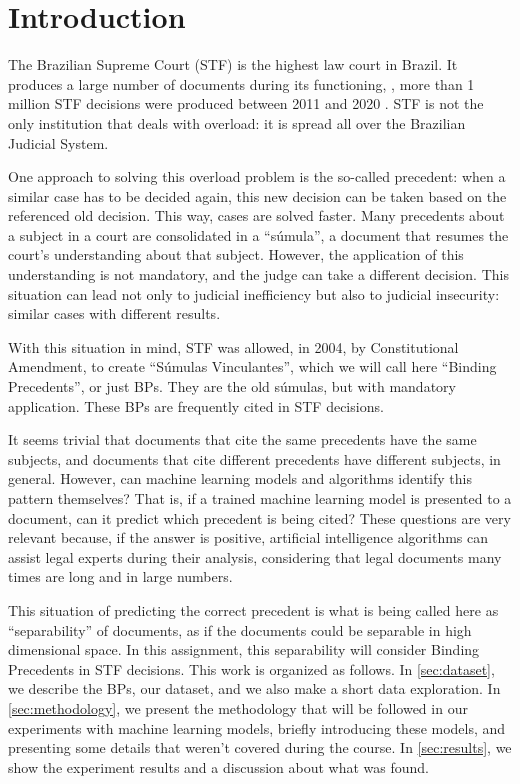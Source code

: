 \section{Introduction}

    The Brazilian Supreme Court (STF) is the highest law court in Brazil. It produces a large number of documents during its functioning, \eg, more than 1 million STF decisions were produced between 2011 and 2020 \cite{stf}. STF is not the only institution that deals with overload: it is spread all over the Brazilian Judicial System.

    One approach to solving this overload problem is the so-called precedent: when a similar case has to be decided again, this new decision can be taken based on the referenced old decision. This way, cases are solved faster. Many precedents about a subject in a court are consolidated in a ``súmula'', a document that resumes the court's understanding about that subject. However, the application of this understanding is not mandatory, and the judge can take a different decision. This situation can lead not only to judicial inefficiency but also to judicial insecurity: similar cases with different results.

    With this situation in mind, STF was allowed, in 2004, by Constitutional Amendment, to create ``Súmulas Vinculantes'', which we will call here ``Binding Precedents'', or just BPs. They are the old súmulas, but with mandatory application. These BPs are frequently cited in STF decisions.

    It seems trivial that documents that cite the same precedents have the same subjects, and documents that cite different precedents have different subjects, in general. However, can machine learning models and algorithms identify this pattern themselves? That is, if a trained machine learning model is presented to a document, can it predict which precedent is being cited? These questions are very relevant because, if the answer is positive, artificial intelligence algorithms can assist legal experts during their analysis, considering that legal documents many times are long and in large numbers.

    This situation of predicting the correct precedent is what is being called here as ``separability'' of documents, as if the documents could be separable in high dimensional space. In this assignment, this separability will consider Binding Precedents in STF decisions. This work is organized as follows. In \autoref{sec:dataset}, we describe the BPs, our dataset, and we also make a short data exploration. In \autoref{sec:methodology}, we present the methodology that will be followed in our experiments with machine learning models, briefly introducing these models, and presenting some details that weren't covered during the course. In \autoref{sec:results}, we show the experiment results and a discussion about what was found.
